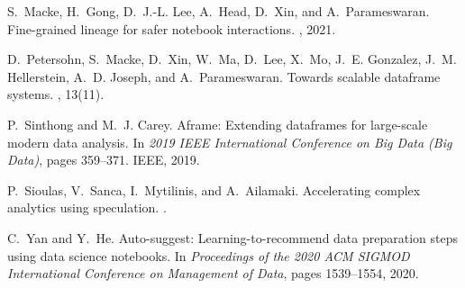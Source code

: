 \documentclass[11pt]{article}
\begin{document}
\begin{thebibliography}{10}
S.~Macke, H.~Gong, D.~J.-L. Lee, A.~Head, D.~Xin, and A.~Parameswaran.
\newblock Fine-grained lineage for safer notebook interactions.
, 2021.

D.~Petersohn, S.~Macke, D.~Xin, W.~Ma, D.~Lee, X.~Mo, J.~E. Gonzalez, J.~M.
  Hellerstein, A.~D. Joseph, and A.~Parameswaran.
\newblock Towards scalable dataframe systems.
, 13(11).

P.~Sinthong and M.~J. Carey.
\newblock Aframe: Extending dataframes for large-scale modern data analysis.
\newblock In {\em 2019 IEEE International Conference on Big Data (Big Data)},
  pages 359--371. IEEE, 2019.

P.~Sioulas, V.~Sanca, I.~Mytilinis, and A.~Ailamaki.
\newblock Accelerating complex analytics using speculation.
.

C.~Yan and Y.~He.
\newblock Auto-suggest: Learning-to-recommend data preparation steps using data
  science notebooks.
\newblock In {\em Proceedings of the 2020 ACM SIGMOD International Conference
  on Management of Data}, pages 1539--1554, 2020.

\end{thebibliography}
\end{document}
